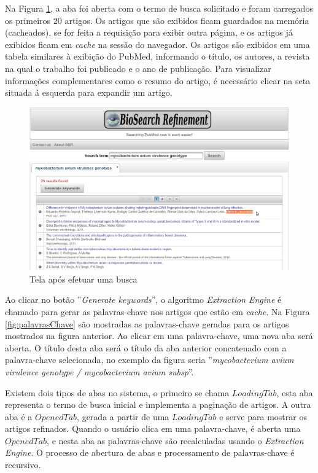 Na Figura \ref{fig:telaComBusca}, a aba foi aberta com o termo de busca solicitado e foram carregados os primeiros 20 artigos. Os artigos que são exibidos ficam guardados na memória (cacheados), se for feita a requisição para exibir outra página, e os artigos já exibidos ficam em \emph{cache} na sessão do navegador. Os artigos são exibidos em uma tabela similares à exibição do PubMed, informando o título, os autores, a revista na qual o trabalho foi publicado e o ano de publicação. Para visualizar informações complementares como o resumo do artigo, é necessário clicar na seta situada á esquerda para expandir um artigo.
\begin{figure}[h!]
    \center
    \includegraphics[scale=0.37]{imagens/telaComBusca.png}
    \caption{Tela após efetuar uma busca \label{fig:telaComBusca}} 
\end{figure}

Ao clicar no botão ''\emph{Generate keywords}'', o algoritmo \emph{Extraction Engine} é chamado para gerar as palavras-chave nos artigos que estão em \emph{cache}. Na Figura \ref{fig:palavrasChave} são mostradas as palavras-chave geradas para os artigos mostrados na figura anterior. Ao clicar em uma palavra-chave, uma nova aba será aberta. O título desta aba será o título da aba anterior concatenado com a palavra-chave selecionada, no exemplo da figura seria ''\emph{mycobacterium avium virulence genotype / mycobacterium avium subsp}''.

Existem dois tipos de abas no sistema, o primeiro se chama $LoadingTab$, esta aba representa o termo de busca inicial e implementa a paginação de artigos. A outra aba é a $OpenedTab$, gerada a partir de uma $LoadingTab$ e serve para mostrar os artigos refinados. Quando o usuário clica em uma palavra-chave, é aberta uma $OpenedTab$, e nesta aba as palavras-chave são recalculadas usando o \emph{Extraction Engine}. O processo de abertura de abas e processamento de palavras-chave é recursivo. 

